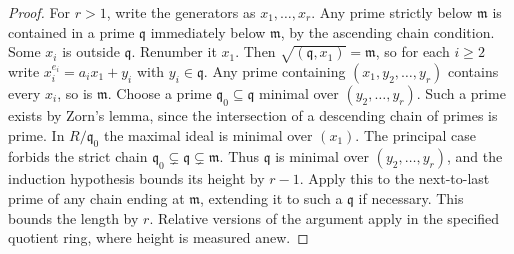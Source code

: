 \documentclass[11pt,oneside,openany]{book}
\theoremstyle{definition}
\theoremstyle{remark}
\begin{document}
\begin{proof}
For \(r>1\), write the generators as \(x_1,\ldots,x_r\). Any prime strictly below \(\mathfrak m\) is contained in a prime \(\mathfrak q\) immediately below \(\mathfrak m\), by the ascending chain condition. Some \(x_i\) is outside \(\mathfrak q\). Renumber it \(x_1\). Then \(\sqrt{(\mathfrak q,x_1)}=\mathfrak m\), so for each \(i\ge2\) write \(x_i^{e_i}=a_ix_1+y_i\) with \(y_i\in\mathfrak q\). Any prime containing \((x_1,y_2,\ldots,y_r)\) contains every \(x_i\), so is \(\mathfrak m\). Choose a prime \(\mathfrak q_0\subseteq\mathfrak q\) minimal over \((y_2,\ldots,y_r)\). Such a prime exists by Zorn's lemma, since the intersection of a descending chain of primes is prime. In \(R/\mathfrak q_0\) the maximal ideal is minimal over \((x_1)\). The principal case forbids the strict chain
\(\mathfrak q_0\subsetneq\mathfrak q\subsetneq\mathfrak m\).
Thus \(\mathfrak q\) is minimal over \((y_2,\ldots,y_r)\), and the induction hypothesis bounds its height by \(r-1\). Apply this to the next-to-last prime of any chain ending at \(\mathfrak m\), extending it to such a \(\mathfrak q\) if necessary. This bounds the length by \(r\). Relative versions of the argument apply in the specified quotient ring, where height is measured anew.
\end{proof}
\end{document}
